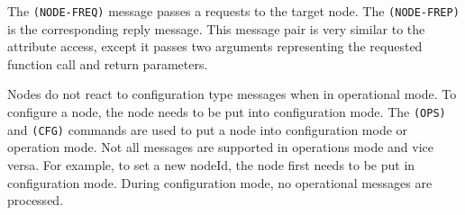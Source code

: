 The \texttt{(NODE-FREQ)} message passes a requests to the target node. The \texttt{(NODE-FREP)} is the corresponding reply message. This message pair is very similar to the attribute access, except it passes two arguments representing the requested function call and return parameters.

\begin{table}[ht!]
    \centering 
\end{table}

Nodes do not react to configuration type messages when in operational mode. To configure a node, the node needs to be put into configuration mode. The \texttt{(OPS)} and \texttt{(CFG)} commands are used to put a node into configuration mode or operation mode. Not all messages are supported in operations mode and vice versa. For example, to set a new nodeId, the node first needs to be put in configuration mode. During configuration mode, no operational messages are processed.

\begin{table}[ht!]
    \centering 
\end{table}


